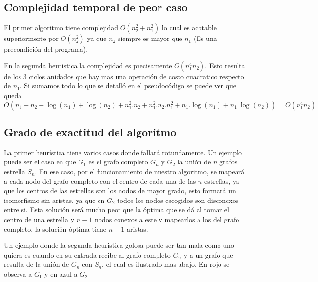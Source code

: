 \subsection{Complejidad temporal de peor caso}

El primer algoritmo tiene complejidad $O(n_2^2 + n_1^2)$ lo cual es acotable superiormente por $O(n_2^2)$ ya que $n_2$ siempre es mayor que $n_1$ (Es una precondición del programa).

En la segunda heuristica la complejidad es precisamente $O(n_1^4 n_2)$. Esto resulta de los 3 ciclos anidados que hay mas una operación de costo cuadratico respecto de $n_1$. Si sumamos todo lo que se detalló en el pseudocódigo se puede ver que queda $O(n_1 + n_2 + \log(n_1) + \log(n_2) + n_1^2.n_2 + n_1^2.n_2.n_1^2 + n_1.\log(n_1) + n_1.\log(n_2)) = O(n_1^4 n_2)$

\subsection{Grado de exactitud del algoritmo}

La primer heurística tiene varios casos donde fallará rotundamente. Un ejemplo puede ser el caso en que $G_1$ es el grafo completo $G_n$ y $G_2$ la unión de $n$ grafos estrella $S_n$. En ese caso, por el funcionamiento de nuestro algoritmo, se mapeará a cada nodo del grafo completo con el centro de cada una de las $n$ estrellas, ya que los centros de las estrellas son los nodos de mayor grado, esto formará un isomorfismo sin aristas, ya que en $G_2$ todos los nodos escogidos son disconexos entre si. Esta solución será mucho peor que la óptima que se dá al tomar el centro de una estrella y $n-1$ nodos conexos a este y mapearlos a los del grafo completo, la solución óptima tiene $n-1$ aristas.


Un ejemplo donde la segunda heuristica golosa puede ser tan mala como uno quiera es cuando en su entrada recibe al grafo completo $G_n$ y a un grafo que resulta de la unión de $G_n$ con $S_n$, el cual es ilustrado mas abajo. En rojo se observa a $G_1$ y en azul a $G_2$

